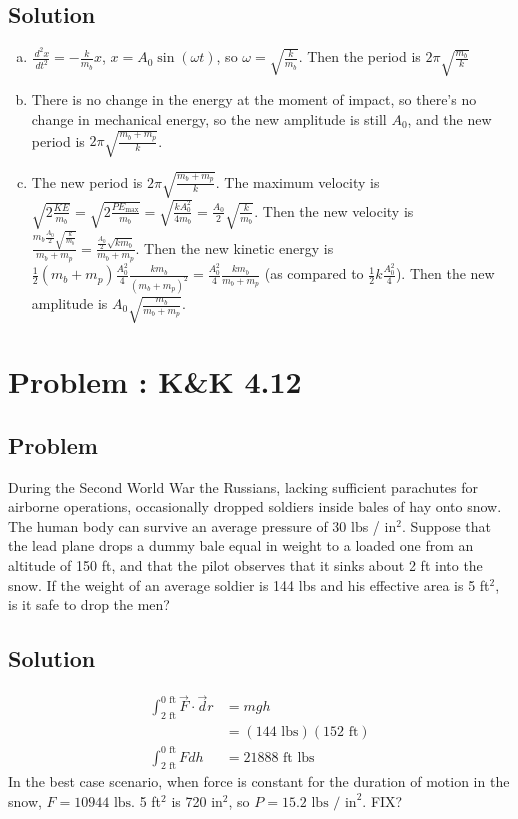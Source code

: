 \documentclass[solutions]{esg8012pset}
\renewcommand{\d}{\,d}
\begin{document}
\subsection{Solution}
  \begin{enumerate}[a)]
    \item $\frac{\d^2 x}{\d t^2} = -\frac{k}{m_b}x$, $x = A_0\sin(\omega t)$, so $\omega = \sqrt{\frac{k}{m_b}}$.  Then the period is $2\pi \sqrt{\frac{m_b}{k}}$
    \item There is no change in the energy at the moment of impact, so there's no change in mechanical energy, so the new amplitude is still $A_0$, and the new period is $2\pi\sqrt{\frac{m_b + m_p}{k}}$.
    \item The new period is $2\pi\sqrt{\frac{m_b + m_p}{k}}$.  The maximum velocity is $\sqrt{2\frac{KE}{m_b}} = \sqrt{2\frac{PE_{\text{max}}}{m_b}} = \sqrt{\frac{k A_0^2}{4m_b}} = \frac{A_0}{2} \sqrt{\frac{k}{m_b}}$.  Then the new velocity is $\frac{m_b\frac{A_0}{2}\sqrt{\frac{k}{m_b}}}{m_b + m_p} = \frac{\frac{A_0}{2}\sqrt{k m_b}}{m_b + m_p}$.  Then the new kinetic energy is $\frac{1}{2}(m_b + m_p)\frac{A_0^2}{4}\frac{k m_b}{(m_b + m_p)^2} = \frac{A_0^2}{4}\frac{k m_b}{m_b + m_p}$ (as compared to $\frac{1}{2}k \frac{A_0^2}{4}$).  Then the new amplitude is $A_0\sqrt{\frac{m_b}{m_b + m_p}}$.
  \end{enumerate}
\section{Problem \thesection: K\&K 4.12}
\subsection{Problem}
  During the Second World War the Russians, lacking sufficient parachutes for airborne operations, occasionally dropped soldiers inside bales of hay onto snow. The human body can survive an average pressure of 30 lbs / in$^2$. Suppose that the lead plane drops a dummy bale equal in weight to a loaded one from an altitude of 150 ft, and that the pilot observes that it sinks about 2 ft into the snow. If the weight of an average soldier is 144 lbs and his effective area is 5 ft$^2$, is it safe to drop the men?
\subsection{Solution}
  \begin{align*}
    \int_{2\text{ ft}}^{0\text{ ft}} \vec F \cdot \vec d r & = m g h \\
    & = (144\text{ lbs})(152\text{ ft}) \\
    \int_{2\text{ ft}}^{0\text{ ft}} F d h & = 21888\text{ ft lbs}
  \end{align*}
  In the best case scenario, when force is constant for the duration of motion in the snow, $F = 10944\text{ lbs}$.  5 ft$^2$ is 720 in$^2$, so $P = 15.2\text{ lbs / in}^2$.  FIX?
\end{document}
